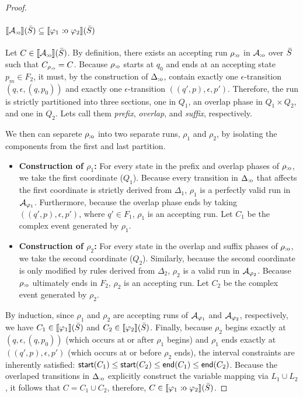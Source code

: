 \begin{proof}
\paragraph{$\sem{\cAoverlap}(\Stream) \subseteq \sem{\varphi_1 \overlap \varphi_2}(\Stream)$}
Let $C \in \sem{\cAoverlap}(\Stream)$. By definition, there exists an accepting run $\rho_{\text{:o}}$ in $\mathcal{A}_{\text{:o}}$ over $\bar{S}$ such that $C_{\rho_{\text{:o}}} = C$. 
Because $\rho_{\text{:o}}$ starts at $q_0$ and ends at an accepting state $p_m \in F_2$, it must, by the construction of $\Delta_{\text{:o}}$, contain exactly one $\epsilon$-transition $(q, \epsilon, (q, p_0))$ and exactly one $\epsilon$-transition $((q', p), \epsilon, p')$. Therefore, the run is strictly partitioned into three sections, one in $Q_1$, an overlap phase in $Q_1 \times Q_2$, and one in $Q_2$. Lets call them \emph{prefix}, \emph{overlap}, and \emph{suffix}, respectively.

We then can separete $\rho_{\text{:o}}$ into two separate runs, $\rho_1$ and $\rho_2$, by isolating the components from the first and last partition.
\begin{itemize}
	\item \textbf{Construction of $\rho_1$:} For every state in the prefix and overlap phases of $\rho_{\text{:o}}$, we take the first coordinate ($Q_1$). Because every transition in $\Delta_{\text{:o}}$ that affects the first coordinate is strictly derived from $\Delta_1$, $\rho_1$ is a perfectly valid run in $\mathcal{A}_{\varphi_1}$. Furthermore, because the overlap phase ends by taking $((q', p), \epsilon, p')$, where $q' \in F_1$, $\rho_1$ is an accepting run. Let $C_1$ be the complex event generated by $\rho_1$.
	
	\item \textbf{Construction of $\rho_2$:} For every state in the overlap and suffix phases of $\rho_{\text{:o}}$, we take the second coordinate ($Q_2$). Similarly, because the second coordinate is only modified by rules derived from $\Delta_2$, $\rho_2$ is a valid run in $\mathcal{A}_{\varphi_2}$. Because $\rho_{\text{:o}}$ ultimately ends in $F_2$, $\rho_2$ is an accepting run. Let $C_2$ be the complex event generated by $\rho_2$.
\end{itemize}
By induction, since $\rho_1$ and $\rho_2$ are accepting runs of $\mathcal{A}_{\varphi_1}$ and $\mathcal{A}_{\varphi_2}$, respectively, we have $C_1 \in \sem{\varphi_1}(\Stream)$ and $C_2 \in \sem{\varphi_2}(\Stream)$. 
Finally, because $\rho_2$ begins exactly at $(q, \epsilon, (q, p_0))$ (which occurs at or after $\rho_1$ begins) and $\rho_1$ ends exactly at $((q', p), \epsilon, p')$ (which occurs at or before $\rho_2$ ends), the interval constraints are inherently satisfied: $\mathsf{start}(C_1) \leq \mathsf{start}(C_2) \leq \mathsf{end}(C_1) \leq \mathsf{end}(C_2)$. 
Because the overlaped transitions in $\Delta_{\text{:o}}$ explicitly construct the variable mapping via $L_1 \cup L_2$, it follows that $C = C_1 \cup C_2$, therefore, $C \in \sem{\varphi_1 \overlap \varphi_2}(\Stream)$.
\end{proof}

